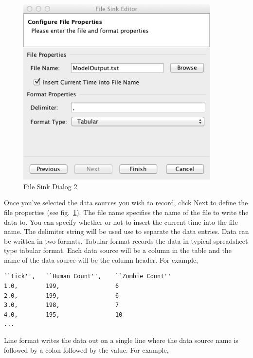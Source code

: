 \documentclass[11pt]{amsart}
\begin{document}
\begin{figure}[h]
\begin{center}
\vspace{.2in}
\centerline {
\includegraphics[width=4in]{images/fs2.png}
}
\caption{File Sink Dialog 2}
\label{fig:fs2}
\end{center}
\end{figure}



Once you've selected the data sources you wish to record, click Next to define the file properties (see fig.~\ref{fig:fs2}). The file name specifies the name of the file to write the data to. You can specify whether or not to insert the current time into the file name. The delimiter string will be used use to separate the data entries. Data can be written in two formats. Tabular format records the data in typical spreadsheet type tabular format. Each data source will be a column in the table and the name of the data source will be the column header. For example,

\noindent\begin{minipage}[h]{\textwidth}
\vspace{.2in}
\lstset{language=java,caption=Tabular Output}
\begin{lstlisting}
``tick'',	``Human Count'',	``Zombie Count''
1.0,		199,				6
2.0,		199,				6
3.0,		198,				7
4.0,		195,				10
...
\end{lstlisting}
\vspace{.2in}
\end{minipage}

Line format writes the data out on a single line where the data source name is followed by a colon followed by the value. For example,
\end{document}
